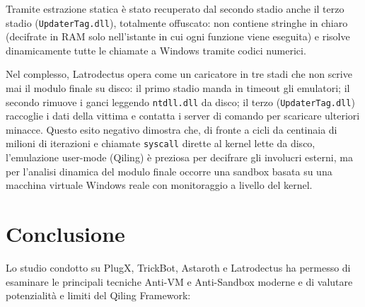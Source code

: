 \documentclass[11pt, a4paper]{article}
\begin{document}
	Tramite estrazione statica è stato recuperato dal secondo stadio anche il terzo stadio (\texttt{UpdaterTag.dll}), totalmente offuscato: non contiene stringhe in chiaro (decifrate in RAM solo nell'istante in cui ogni funzione viene eseguita) e risolve dinamicamente tutte le chiamate a Windows tramite codici numerici.
	
	Nel complesso, Latrodectus opera come un caricatore in tre stadi che non scrive mai il modulo finale su disco: il primo stadio manda in timeout gli emulatori; il secondo rimuove i ganci leggendo \texttt{ntdll.dll} da disco; il terzo (\texttt{UpdaterTag.dll}) raccoglie i dati della vittima e contatta i server di comando per scaricare ulteriori minacce. Questo esito negativo dimostra che, di fronte a cicli da centinaia di milioni di iterazioni e chiamate \texttt{syscall} dirette al kernel lette da disco, l'emulazione user-mode (Qiling) è preziosa per decifrare gli involucri esterni, ma per l'analisi dinamica del modulo finale occorre una sandbox basata su una macchina virtuale Windows reale con monitoraggio a livello del kernel.
	
	\section{Conclusione}
	
	Lo studio condotto su PlugX, TrickBot, Astaroth e Latrodectus ha permesso di esaminare le principali tecniche Anti-VM e Anti-Sandbox moderne e di valutare potenzialità e limiti del Qiling Framework:
	
\end{document}
